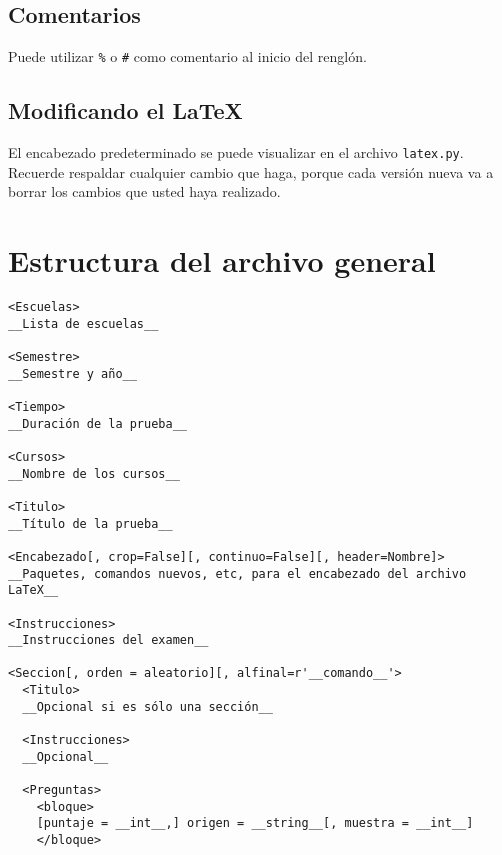 \documentclass[12pt]{article}
\theoremstyle{definition}
\begin{document}
\subsection{Comentarios}
Puede utilizar \verb|%| o \verb|#| como comentario al inicio del renglón.

\subsection{Modificando el \LaTeX}
El encabezado predeterminado se puede visualizar en el archivo \verb|latex.py|. Recuerde respaldar cualquier cambio que haga, porque cada versión nueva va a borrar los cambios que usted haya realizado.

\section{Estructura del archivo general}
\small
\begin{verbatim}
<Escuelas>
__Lista de escuelas__

<Semestre>
__Semestre y año__

<Tiempo>
__Duración de la prueba__

<Cursos>
__Nombre de los cursos__

<Titulo>
__Título de la prueba__

<Encabezado[, crop=False][, continuo=False][, header=Nombre]>
__Paquetes, comandos nuevos, etc, para el encabezado del archivo LaTeX__

<Instrucciones>
__Instrucciones del examen__

<Seccion[, orden = aleatorio][, alfinal=r'__comando__'>
  <Titulo>
  __Opcional si es sólo una sección__

  <Instrucciones>
  __Opcional__

  <Preguntas>
    <bloque>
    [puntaje = __int__,] origen = __string__[, muestra = __int__]
    </bloque>
\end{verbatim}
\normalsize
\end{document}
